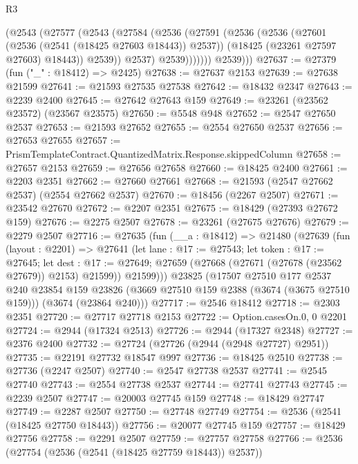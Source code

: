 \begin{lexlean}{R3}
\begin{coremodule}
                (@2543
                  (@27577
                    (@2543
                      (@27584
                        (@2536
                          (@27591
                            (@2536
                              (@2536
                                (@27601 (@2536 (@2541 (@18425 @27603 @18443)) @2537))
                                (@18425 (@23261 @27597 @27603) @18443))
                              @2539))
                          @2537)
                        @2539)))))))
          @2539)))
@27637 := @27379 (fun ("_" : @18412) => @2425)
@27638 := @27637 @2153
@27639 := @27638 @21599
@27641 := @21593 @27535 @27538
@27642 := @18432 @2347
@27643 := @2239 @2400
@27645 := @27642 @27643 @159
@27649 := @23261 (@23562 @23572) (@23567 @23575)
@27650 := @5548 @948
@27652 := @2547 @27650 @2537
@27653 := @21593 @27652
@27655 := @2554 @27650 @2537
@27656 := @27653 @27655
@27657 := PrismTemplateContract.QuantizedMatrix.Response.skippedColumn
@27658 := @27657 @2153
@27659 := @27656 @27658
@27660 := @18425 @2400
@27661 := @2203 @2351
@27662 := @27660 @27661
@27668 := @21593 (@2547 @27662 @2537) (@2554 @27662 @2537)
@27670 := @18456 (@2267 @2507)
@27671 := @23542 @27670
@27672 := @2207 @2351
@27675 := @18429 (@27393 @27672 @159)
@27676 := @2275 @2507
@27678 := @23261 (@27675 @27676)
@27679 := @2279 @2507
@27716 := @27635
    (fun (__a : @18412) =>
    @21480
      (@27639
        (fun (layout : @2201) =>
        @27641
          (let lane : @17 := @27543;
          let token : @17 := @27645;
          let dest : @17 := @27649; @27659 (@27668 (@27671 (@27678 (@23562 @27679)) @2153) @21599))
          @21599)))
    @23825
    (@17507
      @27510
      @177
      @2537
      @240
      @23854
      @159
      @23826
      (@3669 @27510 @159 @2388 (@3674 (@3675 @27510 @159)))
      (@3674 (@23864 @240)))
@27717 := @2546 @18412
@27718 := @2303 @2351
@27720 := @27717 @27718 @2153
@27722 := Option.casesOn.{0, 0} @2201
@27724 := @2944 (@17324 @2513)
@27726 := @2944 (@17327 @2348)
@27727 := @2376 @2400
@27732 := @27724 (@27726 (@2944 (@2948 @27727) @2951))
@27735 := @22191 @27732 @18547 @997
@27736 := @18425 @2510
@27738 := @27736 (@2247 @2507)
@27740 := @2547 @27738 @2537
@27741 := @2545 @27740
@27743 := @2554 @27738 @2537
@27744 := @27741 @27743
@27745 := @2239 @2507
@27747 := @20003 @27745 @159
@27748 := @18429 @27747
@27749 := @2287 @2507
@27750 := @27748 @27749
@27754 := @2536 (@2541 (@18425 @27750 @18443))
@27756 := @20077 @27745 @159
@27757 := @18429 @27756
@27758 := @2291 @2507
@27759 := @27757 @27758
@27766 := @2536 (@27754 (@2536 (@2541 (@18425 @27759 @18443)) @2537))

\end{coremodule}
\end{lexlean}
